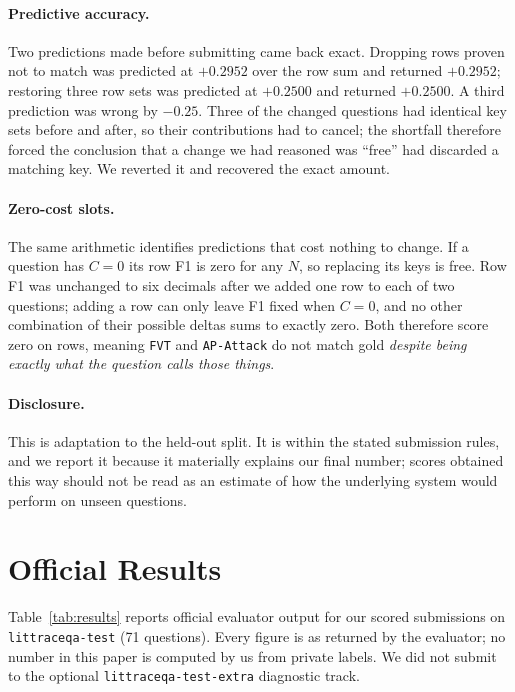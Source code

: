 \documentclass[11pt]{article}
\newcommand{\bk}{\allowbreak}
\begin{document}
\paragraph{Predictive accuracy.}
Two predictions made before submitting came back exact. Dropping rows proven not
to match was predicted at $+0.2952$ over the row sum and returned $+0.2952$;
restoring three row sets was predicted at $+0.2500$ and returned $+0.2500$. A
third prediction was wrong by $-0.25$. Three of the changed questions had
identical key sets before and after, so their contributions had to cancel; the
shortfall therefore forced the conclusion that a change we had reasoned was
``free'' had discarded a matching key. We reverted it and recovered the exact
amount.

\paragraph{Zero-cost slots.}
The same arithmetic identifies predictions that cost nothing to change. If a
question has $C=0$ its row F1 is zero for any $N$, so replacing its keys is free.
Row F1 was unchanged to six decimals after we added one row to each of two
questions; adding a row can only leave F1 fixed when $C=0$, and no other
combination of their possible deltas sums to exactly zero. Both therefore score
zero on rows, meaning \texttt{FVT} and \texttt{AP-Attack} do not match gold
\emph{despite being exactly what the question calls those things}.

\paragraph{Disclosure.}
This is adaptation to the held-out split. It is within the stated submission
rules, and we report it because it materially explains our final number; scores
obtained this way should not be read as an estimate of how the underlying system
would perform on unseen questions.

\section{Official Results}
\label{sec:results}

Table~\ref{tab:results} reports official evaluator output for our scored
submissions on \texttt{littraceqa-\bk{}test} (71 questions). Every figure is as
returned by the evaluator; no number in this paper is computed by us from private
labels. We did not submit to the optional \texttt{littraceqa-\bk{}test-\bk{}extra}
diagnostic track.
\end{document}
